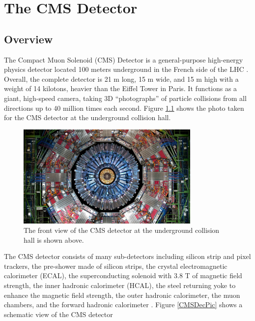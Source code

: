 \chapter{The CMS Detector}

\section{Overview}

The Compact Muon Solenoid (CMS) Detector is a general-purpose high-energy physics detector located 100 meters underground in the French side of the LHC \cite{CMSDetector}. Overall, the complete detector is 21 m long, 15 m wide, and 15 m high with a weight of 14 kilotons, heavier than the Eiffel Tower in Paris. It functions as a giant, high-speed camera, taking 3D ``photographs'' of particle collisions from all directions up to 40 million times each second. Figure \ref{CMSRealPic} shows the photo taken for the CMS detector at the underground collision hall.

\begin{figure}[hbtp]
\begin{center}
\includegraphics[width=0.80\textwidth]{Figures/Chapter3/CMSRealPic.jpg}
\caption{The front view of the CMS detector at the underground collision hall is shown above.}
\label{CMSRealPic}
\end{center}
\end{figure} 

The CMS detector consists of many sub-detectors including silicon strip and pixel trackers, the pre-shower made of silicon strips, the crystal electromagnetic calorimeter (ECAL), the superconducting solenoid with 3.8 T of magnetic field strength, the inner hadronic calorimeter (HCAL), the steel returning yoke to enhance the magnetic field strength, the outer hadronic calorimeter, the muon chambers, and the forward hadronic calorimeter \cite{CMSDetector}. Figure \ref{CMSDecPic} shows a schematic view of the CMS detector

